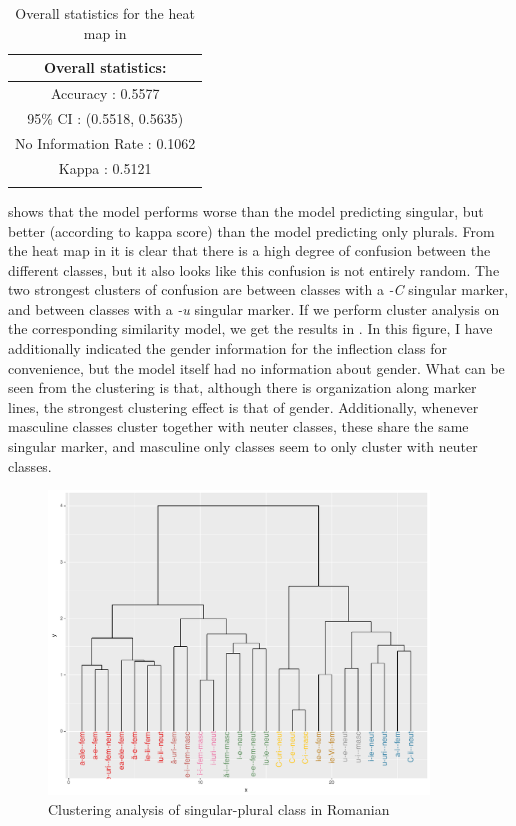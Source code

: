 \begin{table}
  \centering
  \begin{tabular}{c}
    \lsptoprule
    Overall statistics: \\
    \midrule
    Accuracy : 0.5577\\
    95\% CI : (0.5518, 0.5635)\\
    No Information Rate : 0.1062\\
    Kappa : 0.5121\\
    \lspbottomrule
  \end{tabular}
  \caption{Overall statistics for the heat map in }\label{tab:class-1-romanian-stats}
\end{table}

 shows that the model performs worse than the model predicting singular, but better (according to kappa score) than the model predicting only plurals. From the heat map in  it is clear that there is a high degree of confusion between the different classes, but it also looks like this confusion is not entirely random. The two strongest clusters of confusion are between classes with a \textit{-C} singular marker, and between classes with a \textit{-u} singular marker. If we perform cluster analysis on the corresponding similarity model, we get the results in . In this figure, I have additionally indicated the gender information for the inflection class for convenience, but the model itself had no information about gender. What can be seen from the clustering is that, although there is organization along marker lines, the strongest clustering effect is that of gender. Additionally, whenever masculine classes cluster together with neuter classes, these share the same singular marker, and masculine only classes seem to only cluster with neuter classes.

\begin{figure}
  \centering
  \includegraphics[width=0.9\textwidth]{./figures/romanian/romanian-clust-class-1.pdf}
  \caption{Clustering analysis of singular-plural class in Romanian}\label{fig:romanian-clust-class-1}
\end{figure}

